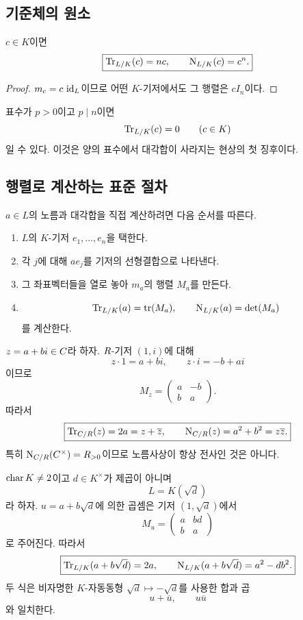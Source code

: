 \subsection{기준체의 원소}

\begin{proposition}
\label{prop:norm-trace-scalars}
$c\in K$이면
\[
  \boxed{
  \operatorname{Tr}_{L/K}(c)=nc,
  \qquad
  \operatorname{N}_{L/K}(c)=c^n.}
\]
\end{proposition}

\begin{proof}
$m_c=c\,\operatorname{id}_L$이므로 어떤 $K$-기저에서도 그 행렬은 $cI_n$이다.
\end{proof}

표수가 $p>0$이고 $p\mid n$이면
\[
  \operatorname{Tr}_{L/K}(c)=0\qquad(c\in K)
\]
일 수 있다. 이것은 양의 표수에서 대각합이 사라지는 현상의 첫 징후이다.

\subsection{행렬로 계산하는 표준 절차}

$a\in L$의 노름과 대각합을 직접 계산하려면 다음 순서를 따른다.
\begin{enumerate}
  \item $L$의 $K$-기저 $e_1,\dots,e_n$을 택한다.
  \item 각 $j$에 대해 $ae_j$를 기저의 선형결합으로 나타낸다.
  \item 그 좌표벡터들을 열로 놓아 $m_a$의 행렬 $M_a$를 만든다.
  \item
  \[
    \operatorname{Tr}_{L/K}(a)=\operatorname{tr}(M_a),
    \qquad
    \operatorname{N}_{L/K}(a)=\det(M_a)
  \]
  를 계산한다.
\end{enumerate}

\begin{example}[$\C/\R$]
$z=a+bi\in C$라 하자. $R$-기저 $(1,i)$에 대해
\[
  z\cdot1=a+bi,\qquad
  z\cdot i=-b+ai
\]
이므로
\[
  M_z=
  \begin{pmatrix}
    a&-b\\
    b&a
  \end{pmatrix}.
\]
따라서
\[
  \boxed{
  \operatorname{Tr}_{C/R}(z)=2a=z+\overline z,
  \qquad
  \operatorname{N}_{C/R}(z)=a^2+b^2=z\overline z.}
\]
특히 $\operatorname{N}_{C/R}(C^\times)=R_{>0}$이므로 노름사상이 항상 전사인 것은 아니다.
\end{example}

\begin{example}[이차확장]
$\operatorname{char} K\ne2$이고 $d\in K^\times$가 제곱이 아니며
\[
  L=K(\sqrt d)
\]
라 하자. $u=a+b\sqrt d$에 의한 곱셈은 기저 $(1,\sqrt d)$에서
\[
  M_u=
  \begin{pmatrix}
    a&bd\\
    b&a
  \end{pmatrix}
\]
로 주어진다. 따라서
\[
  \boxed{
  \operatorname{Tr}_{L/K}(a+b\sqrt d)=2a,
  \qquad
  \operatorname{N}_{L/K}(a+b\sqrt d)=a^2-db^2.}
\]
두 식은 비자명한 $K$-자동동형
$\sqrt d\mapsto-\sqrt d$를 사용한 합과 곱
\[
  u+\overline u,\qquad u\overline u
\]
와 일치한다.
\end{example}

